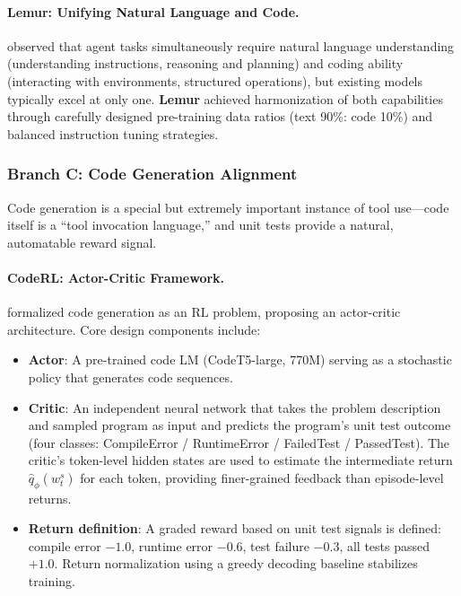 \paragraph{Lemur: Unifying Natural Language and Code.}
\citet{xu2023lemur} observed that agent tasks simultaneously require natural language understanding (understanding instructions, reasoning and planning) and coding ability (interacting with environments, structured operations), but existing models typically excel at only one. \textbf{Lemur} achieved harmonization of both capabilities through carefully designed pre-training data ratios (text 90\%: code 10\%) and balanced instruction tuning strategies.

\subsubsection{Branch C: Code Generation Alignment}

Code generation is a special but extremely important instance of tool use---code itself is a ``tool invocation language,'' and unit tests provide a natural, automatable reward signal.

\paragraph{CodeRL: Actor-Critic Framework.}
 formalized code generation as an RL problem, proposing an actor-critic architecture. Core design components include:

\begin{itemize}[leftmargin=*]
  \item \textbf{Actor}: A pre-trained code LM (CodeT5-large, 770M) serving as a stochastic policy that generates code sequences.
  \item \textbf{Critic}: An independent neural network that takes the problem description and sampled program as input and predicts the program's unit test outcome (four classes: CompileError / RuntimeError / FailedTest / PassedTest). The critic's token-level hidden states are used to estimate the intermediate return $\hat{q}_{\phi}(w_t^s)$ for each token, providing finer-grained feedback than episode-level returns.
  \item \textbf{Return definition}: A graded reward based on unit test signals is defined: compile error $-1.0$, runtime error $-0.6$, test failure $-0.3$, all tests passed $+1.0$. Return normalization using a greedy decoding baseline stabilizes training.
\end{itemize}

